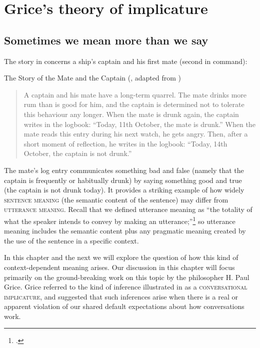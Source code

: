 \chapter{Grice’s theory of implicature}\label{sec:8}

\section{Sometimes we mean more than we say}\label{sec:8.1}

The story in  concerns a ship’s captain and his first mate (second in command):

\ea \label{ex:8.1}
The Story of the Mate and the Captain (\citealt{Meibauer2005}, adapted from \citealt{Posner1980})\\
\begin{quote}
A captain and his mate have a long-term quarrel. The mate drinks more rum than is good for him, and the captain is determined not to tolerate this behaviour any longer. When the mate is drunk again, the captain writes in the logbook: “Today, 11th October, the mate is drunk.” When the mate reads this entry during his next watch, he gets angry. Then, after a short moment of reflection, he writes in the logbook: “Today, 14th October, the captain is not drunk.”
\end{quote}
\z


The mate’s log entry communicates something bad and false (namely that the captain is frequently or habitually drunk) by saying something good and true (the captain is not drunk today). It provides a striking example of how widely \textsc{sentence meaning} (the semantic content of the sentence) may differ from \textsc{utterance meaning}. Recall that we defined utterance meaning as “the totality of what the speaker intends to convey by making an utterance;”\footnote{\citet[27]{Cruse2000}.} so utterance meaning includes the semantic content plus any pragmatic meaning created by the use of the sentence in a specific context.



In this chapter and the next we will explore the question of how this kind of context-dependent meaning arises. Our discussion in this chapter will focus primarily on the ground-breaking work on this topic by the philosopher H. Paul Grice. Grice referred to the kind of inference illustrated in  as a \textsc{conversational implicature}, and suggested that such inferences arise when there is a real or apparent violation of our shared default expectations about how conversations work.



